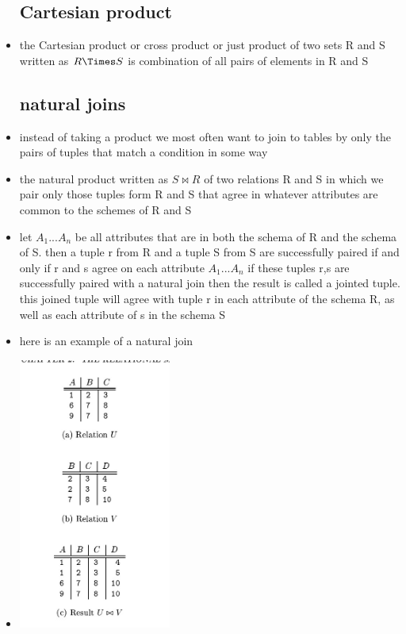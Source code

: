 \documentclass{article}
\begin{document}
\begin{itemize}
\subsection{Cartesian product}
\item the Cartesian product or cross product or just product of two sets R and S written as $R\Times S$ is combination of all pairs of elements in R and S 
\subsection{natural joins}
\item instead of taking a product we most often want to join to tables by only the pairs of tuples that match a condition in some way
\item the natural product written as $S \bowtie R$ of two relations R and S in which we pair only those tuples form R and S that agree in whatever attributes are common to the schemes of R and S
\item let $A_1...A_n$ be all attributes that are in both the schema of R and the schema of S. then a tuple r from R and a tuple S from S are successfully paired if and only if r and s agree on each attribute $A_1...A_n$ if these tuples r,s are successfully paired with a natural join then the result is called a jointed tuple. this joined tuple will agree with tuple r in each attribute of the schema R, as well as each attribute of s in the schema S
\item here is an example of a natural join 
\item \includegraphics[width=5cm]{reading assignment notes/week 1/database systems the complete book chapter 2/natural_join.jpg}

\end{itemize}
\end{document}
